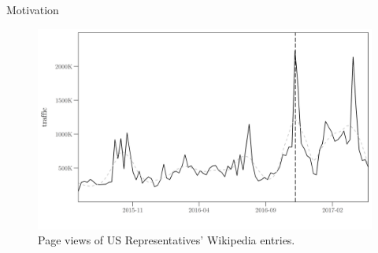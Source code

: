 \begin{frame}{Motivation}
\begin{figure}[t]
\begin{center}
\vspace{-.1cm}
	\includegraphics[scale=.53]{usah_time5.png}
	\vspace{-.5cm}
	\caption{Page views of US Representatives’ Wikipedia entries.}
\end{center}
\end{figure}
\end{frame}

